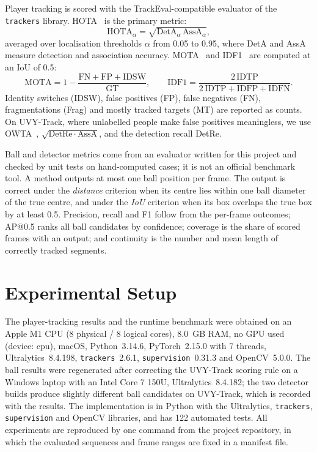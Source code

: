 \documentclass[11pt,a4paper]{article}
\begin{document}
Player tracking is scored with the TrackEval-compatible evaluator of the
\texttt{trackers} library. HOTA~\cite{hota} is the primary metric:
\begin{equation}
\mathrm{HOTA}_{\alpha}=\sqrt{\mathrm{DetA}_{\alpha}\,\mathrm{AssA}_{\alpha}},
\label{eq:hota}
\end{equation}
averaged over localisation thresholds $\alpha$ from 0.05 to 0.95, where DetA and
AssA measure detection and association accuracy. MOTA~\cite{clear} and
IDF1~\cite{idf1} are computed at an IoU of 0.5:
\begin{equation}
\mathrm{MOTA}=1-\frac{\mathrm{FN}+\mathrm{FP}+\mathrm{IDSW}}{\mathrm{GT}},\qquad
\mathrm{IDF1}=\frac{2\,\mathrm{IDTP}}{2\,\mathrm{IDTP}+\mathrm{IDFP}+\mathrm{IDFN}}.
\label{eq:mota}
\end{equation}
Identity switches (IDSW), false positives (FP), false negatives (FN),
fragmentations (Frag) and mostly tracked targets (MT) are reported as counts. On
UVY-Track, where unlabelled people make false positives meaningless, we use
OWTA~\cite{owta}, $\sqrt{\mathrm{DetRe}\cdot\mathrm{AssA}}$, and the detection
recall DetRe.

Ball and detector metrics come from an evaluator written for this project and
checked by unit tests on hand-computed cases; it is not an official benchmark
tool. A method outputs at most one ball position per frame. The output is
correct under the \emph{distance} criterion when its centre lies within one ball
diameter of the true centre, and under the \emph{IoU} criterion when its box
overlaps the true box by at least 0.5. Precision, recall and F1 follow from the
per-frame outcomes; AP@0.5 ranks all ball candidates by confidence; coverage is
the share of scored frames with an output; and continuity is the number and
mean length of correctly tracked segments.

\section{Experimental Setup}
The player-tracking results and the runtime benchmark were obtained on an
Apple M1 CPU (8 physical / 8 logical cores), 8.0~GB RAM, no GPU used (device: cpu), macOS, Python~3.14.6, PyTorch~2.15.0 with 7 threads, Ultralytics~8.4.198, \texttt{trackers}~2.6.1, \texttt{supervision}~0.31.3 and OpenCV~5.0.0. The ball results were regenerated after correcting the UVY-Track
scoring rule on a Windows laptop with an Intel Core 7 150U, Ultralytics~8.4.182; the two detector builds
produce slightly different ball candidates on UVY-Track, which is recorded with
the results. The implementation is in Python with the Ultralytics, \texttt{trackers},
\texttt{supervision} and OpenCV libraries, and has 122 automated tests. All
experiments are reproduced by one command from the project repository, in which
the evaluated sequences and frame ranges are fixed in a manifest file.
\end{document}
